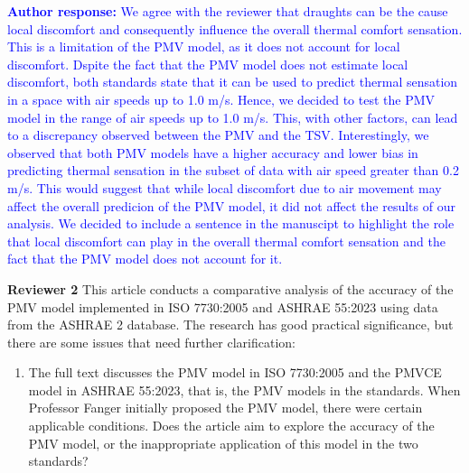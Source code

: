 \documentclass[a4paper, 10pt]{letter}
\newcommand{\response}[1]{\textcolor{blue}{\textbf{Author response:} #1}}
\begin{document}
\begin{letter}
\begin{enumerate}
            \response{
                We agree with the reviewer that draughts can be the cause local discomfort and consequently influence the overall thermal comfort sensation.
                This is a limitation of the PMV model, as it does not account for local discomfort.
                Dspite the fact that the PMV model does not estimate local discomfort, both standards state that it can be used to predict thermal sensation in a space with air speeds up to 1.0 m/s.
                Hence, we decided to test the PMV model in the range of air speeds up to 1.0 m/s.
                This, with other factors, can lead to a discrepancy observed between the PMV and the TSV.
                Interestingly, we observed that both PMV models have a higher accuracy and lower bias in predicting thermal sensation in the subset of data with air speed greater than 0.2 m/s.
                This would suggest that while local discomfort due to air movement may affect the overall predicion of the PMV model, it did not affect the results of our analysis.
                We decided to include a sentence in the manuscipt to highlight the role that local discomfort can play in the overall thermal comfort sensation and the fact that the PMV model does not account for it.
            }

        \end{enumerate}

        \clearpage

        \textbf{Reviewer 2}
        This article conducts a comparative analysis of the accuracy of the PMV model implemented in ISO 7730:2005 and ASHRAE 55:2023 using data from the ASHRAE 2 database.
        The research has good practical significance, but there are some issues that need further clarification:

        \begin{enumerate}
            \item The full text discusses the PMV model in ISO 7730:2005 and the PMVCE model in ASHRAE 55:2023, that is, the PMV models in the standards.
            When Professor Fanger initially proposed the PMV model, there were certain applicable conditions.
            Does the article aim to explore the accuracy of the PMV model, or the inappropriate application of this model in the two standards?


\end{enumerate}
\end{letter}
\end{document}
